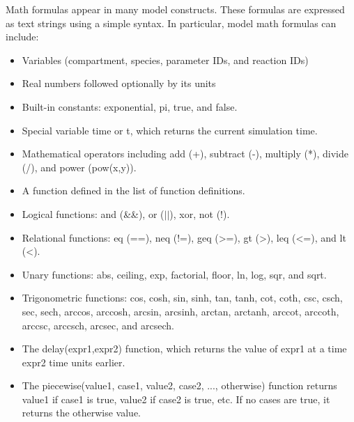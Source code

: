 \documentclass[titlepage,11pt]{article}
\begin{document}
\noindent
Math formulas appear in many model constructs.  These formulas are expressed as text strings using a simple syntax.  In particular, model math formulas can include: 
\begin{itemize}
\item Variables (compartment, species, parameter IDs, and reaction IDs)
\item Real numbers followed optionally by its units
\item Built-in constants: exponential, pi, true, and false.
\item Special variable time or t, which returns the current simulation time.
\item Mathematical operators including add (+), subtract (-), multiply (*), divide (/), and power (pow(x,y)).
\item A function defined in the list of function definitions.
\item Logical functions: and (\&\&), or ($||$), xor, not (!).
\item Relational functions: eq (==), neq (!=), geq (>=), gt (>), leq (<=), and lt (<).
\item Unary functions: abs, ceiling, exp, factorial, floor, ln, log, sqr, and sqrt.
\item Trigonometric functions: cos, cosh, sin, sinh, tan, tanh, cot, coth, csc, csch, sec, sech, arccos, arccosh, arcsin, arcsinh, arctan, arctanh, arccot, arccoth, arccsc, arccsch, arcsec, and arcsech.
\item The delay(expr1,expr2) function, which returns the value of expr1 at a time expr2 time units earlier.
\item The piecewise(value1, case1, value2, case2, ..., otherwise) function returns value1 if case1 is true, value2 if case2 is true, etc.  If no cases are true, it returns the otherwise value.
\end{itemize}
\end{document}

